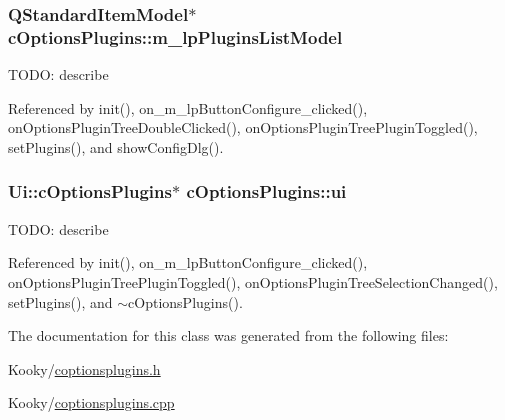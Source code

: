 \subsubsection[{\texorpdfstring{m\+\_\+lp\+Plugins\+List\+Model}{m_lpPluginsListModel}}]{\setlength{\rightskip}{0pt plus 5cm}Q\+Standard\+Item\+Model$\ast$ c\+Options\+Plugins\+::m\+\_\+lp\+Plugins\+List\+Model\hspace{0.3cm}{\ttfamily [private]}}\hypertarget{classc_options_plugins_ab32e360c0936198360a2e48a431878da}{}\label{classc_options_plugins_ab32e360c0936198360a2e48a431878da}
T\+O\+DO\+: describe 

Referenced by init(), on\+\_\+m\+\_\+lp\+Button\+Configure\+\_\+clicked(), on\+Options\+Plugin\+Tree\+Double\+Clicked(), on\+Options\+Plugin\+Tree\+Plugin\+Toggled(), set\+Plugins(), and show\+Config\+Dlg().

\subsubsection[{\texorpdfstring{ui}{ui}}]{\setlength{\rightskip}{0pt plus 5cm}Ui\+::c\+Options\+Plugins$\ast$ c\+Options\+Plugins\+::ui\hspace{0.3cm}{\ttfamily [private]}}\hypertarget{classc_options_plugins_aa5588423bcff87a624b984653a9cce6a}{}\label{classc_options_plugins_aa5588423bcff87a624b984653a9cce6a}
T\+O\+DO\+: describe 

Referenced by init(), on\+\_\+m\+\_\+lp\+Button\+Configure\+\_\+clicked(), on\+Options\+Plugin\+Tree\+Plugin\+Toggled(), on\+Options\+Plugin\+Tree\+Selection\+Changed(), set\+Plugins(), and $\sim$c\+Options\+Plugins().



The documentation for this class was generated from the following files\+:\begin{DoxyCompactItemize}
\item 
Kooky/\hyperlink{coptionsplugins_8h}{coptionsplugins.\+h}\item 
Kooky/\hyperlink{coptionsplugins_8cpp}{coptionsplugins.\+cpp}\end{DoxyCompactItemize}
